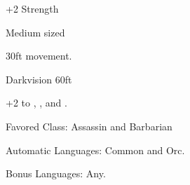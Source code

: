 

\begin{itemize*}
\item +2 Strength
\item Medium sized
\item 30ft movement.
\item Darkvision 60ft
\item +2 to , , and .
\item Favored Class: Assassin and Barbarian
\item Automatic Languages: Common and Orc.
\item Bonus Languages: Any.
\end{itemize*}
